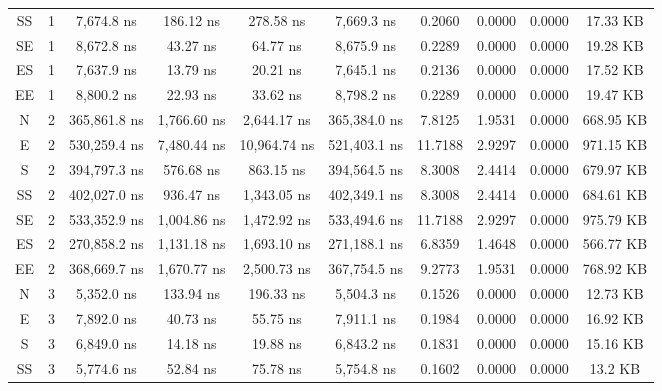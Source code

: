 \begin{sidewaystable}
\begin{tabular}{|c|c|c|c|c|c|c|c|c|c|}
        SS     & 1     & 7,674.8 ns      & 186.12 ns     & 278.58 ns     & 7,669.3 ns      & 0.2060   & 0.0000   & 0.0000   & 17.33 KB    \\
        SE     & 1     & 8,672.8 ns      & 43.27 ns      & 64.77 ns      & 8,675.9 ns      & 0.2289   & 0.0000   & 0.0000   & 19.28 KB    \\
        ES     & 1     & 7,637.9 ns      & 13.79 ns      & 20.21 ns      & 7,645.1 ns      & 0.2136   & 0.0000   & 0.0000   & 17.52 KB    \\
        EE     & 1     & 8,800.2 ns      & 22.93 ns      & 33.62 ns      & 8,798.2 ns      & 0.2289   & 0.0000   & 0.0000   & 19.47 KB    \\
        N      & 2     & 365,861.8 ns    & 1,766.60 ns   & 2,644.17 ns   & 365,384.0 ns    & 7.8125   & 1.9531   & 0.0000   & 668.95 KB   \\
        E      & 2     & 530,259.4 ns    & 7,480.44 ns   & 10,964.74 ns  & 521,403.1 ns    & 11.7188  & 2.9297   & 0.0000   & 971.15 KB   \\
        S      & 2     & 394,797.3 ns    & 576.68 ns     & 863.15 ns     & 394,564.5 ns    & 8.3008   & 2.4414   & 0.0000   & 679.97 KB   \\
        SS     & 2     & 402,027.0 ns    & 936.47 ns     & 1,343.05 ns   & 402,349.1 ns    & 8.3008   & 2.4414   & 0.0000   & 684.61 KB   \\
        SE     & 2     & 533,352.9 ns    & 1,004.86 ns   & 1,472.92 ns   & 533,494.6 ns    & 11.7188  & 2.9297   & 0.0000   & 975.79 KB   \\
        ES     & 2     & 270,858.2 ns    & 1,131.18 ns   & 1,693.10 ns   & 271,188.1 ns    & 6.8359   & 1.4648   & 0.0000   & 566.77 KB   \\
        EE     & 2     & 368,669.7 ns    & 1,670.77 ns   & 2,500.73 ns   & 367,754.5 ns    & 9.2773   & 1.9531   & 0.0000   & 768.92 KB   \\
        N      & 3     & 5,352.0 ns      & 133.94 ns     & 196.33 ns     & 5,504.3 ns      & 0.1526   & 0.0000   & 0.0000   & 12.73 KB    \\
        E      & 3     & 7,892.0 ns      & 40.73 ns      & 55.75 ns      & 7,911.1 ns      & 0.1984   & 0.0000   & 0.0000   & 16.92 KB    \\
        S      & 3     & 6,849.0 ns      & 14.18 ns      & 19.88 ns      & 6,843.2 ns      & 0.1831   & 0.0000   & 0.0000   & 15.16 KB    \\
        SS     & 3     & 5,774.6 ns      & 52.84 ns      & 75.78 ns      & 5,754.8 ns      & 0.1602   & 0.0000   & 0.0000   & 13.2 KB     \\

\end{tabular}
\end{sidewaystable}
